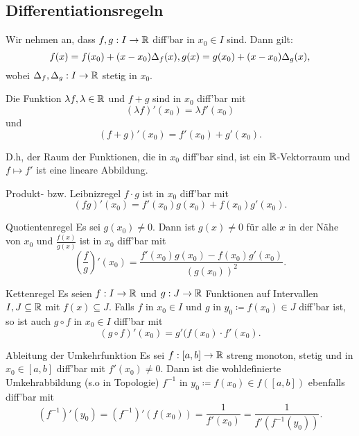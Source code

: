 \subsection{Differentiationsregeln}
Wir nehmen an, dass $f, g: I\to\mathbb{R}$ diff'bar in $x_0\in I$ sind. Dann gilt:
\[
    f(x) = f(x_0)+(x-x_0)\Delta_f(x),\\
    g(x) = g(x_0)+(x-x_0)\Delta_g(x),
\] wobei $\Delta_f, \Delta_g: I\to \mathbb{R}$ stetig in $x_0$.

\begin{satz} Die Funktion $\lambda f, \lambda\in\mathbb{R}$ und $f+g$ sind in $x_0$ diff'bar mit
    \[
        (\lambda f)'(x_0) = \lambda f'(x_0)
    \] und
    \[
        (f+g)'(x_0) = f'(x_0)+g'(x_0).
    \]
\end{satz}
\begin{bem} D.h, der Raum der Funktionen, die in $x_0$ diff'bar sind, ist ein $\mathbb{R}$-Vektorraum und $f\mapsto f'$ ist eine lineare
    Abbildung.
\end{bem}

\begin{satz}{Produkt- bzw. Leibnizregel}
    $f\cdot g$ ist in $x_0$ diff'bar mit
    \[
        (fg)'(x_0) = f'(x_0)g(x_0)+f(x_0)g'(x_0).
    \]
\end{satz}
\begin{satz}{Quotientenregel}
    Es sei $g(x_0)\neq 0$. Dann ist $g(x)\neq 0$ für alle $x$ in der Nähe von $x_0$ und $\frac{f(x)}{g(x)}$ ist in $x_0$ diff'bar mit
    \[
        \left(\frac{f}{g}\right)'(x_0)=\frac{f'(x_0)g(x_0)-f(x_0)g'(x_0)}{(g(x_0))^2}.
    \]
\end{satz}
\begin{satz}{Kettenregel}
    Es seien $f:I\to \mathbb{R}$ und $g:J\to \mathbb{R}$ Funktionen auf Intervallen $I,J\subseteq \mathbb{R}$ mit $f(x)\subseteq J$.
    Falls $f$ in $x_0\in I$ und $g$ in $y_{0}\coloneq f(x_0)\in J$ diff'bar ist, so ist auch $g\circ f$ in $x_0\in I$ diff'bar mit
    \[
        (g\circ f)'(x_0) = g'(f(x_0)\cdot f'(x_0).
    \]
\end{satz}

\begin{satz}{Ableitung der Umkehrfunktion}
    Es sei $f:[a,b]\to \mathbb{R}$ streng monoton, stetig und in $x_0\in [a,b]$ diff'bar mit $f'(x_0)\neq 0$. Dann ist die wohldefinierte Umkehrabbildung (s.o in Topologie)
    $f^{-1}$ in $y_0\coloneqq f(x_0)\in f([a,b])$ ebenfalls diff'bar mit
    \[
        (f^{-1})'(y_0)=(f^{-1})'(f(x_0))=\frac{1}{f'(x_0)}=\frac{1}{f'(f^{-1}(y_0))}.
    \]
\end{satz}